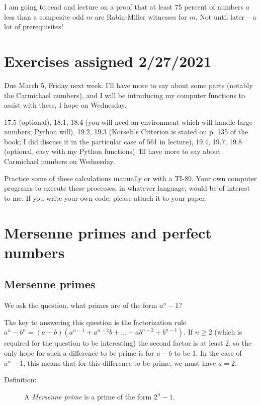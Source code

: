 \documentclass[12pt]{article}
\begin{document}
I am going to read and lecture on a proof that at least 75 percent of numbers $a$ less than a composite odd $m$ are Rabin-Miller witnesses for $m$.  Not until later -- a lot of prerequisites!




\section{Exercises  assigned 2/27/2021}

Due March 5, Friday next week.  I'll have more to say about some parts (notably the Carmichael numbers), and I will be introducing my computer functions to assist with these, I hope on Wednesday.

17.5 (optional), 18.1, 18.4 (you will need an environment which will handle large numbers;  Python will), 19.2, 19.3 (Korselt's Criterion is stated on p. 135 of the book;  I did discuss it in the particular case of 561 in lecture), 19.4, 19.7, 19.8 (optional, easy with my Python functions).  Ill have more to say about Carmichael numbers on Wednesday.

Practice some of these calculations manually or with a TI-89.   Your own computer programs to execute these processes, in whatever language, would be of interest to me.  If you write your own code, please attach it to your paper.

\section{Mersenne primes and perfect numbers}

\subsection{Mersenne primes}

We ask the question, what primes are of the form $a^n-1$?

The key to answering this question is the factorization rule $a^n-b^n=(a-b)(a^{n-1}+a^{n-2}b+\ldots+ab^{n-2}+b^{n-1})$.  If $n\geq 2$ (which is required for the question to be interesting) the second factor is at least 2,
so the only hope for such a difference to be prime is for $a-b$ to be 1.   In the case of $a^n-1$, this means that for this difference to be prime, we must have $a=2$.

\begin{description}

\item[Definition:]  A {\em Mersenne prime\/} is a prime of the form $2^n-1$.



\end{description}
\end{document}
